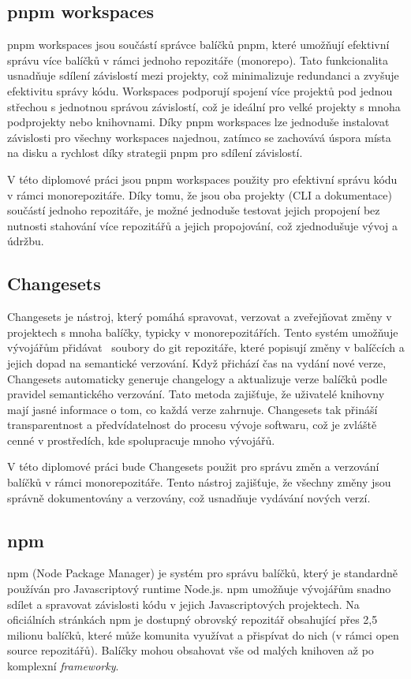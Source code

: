 \subsection{pnpm workspaces}
pnpm workspaces jsou součástí správce balíčků pnpm, které umožňují efektivní správu více balíčků v rámci jednoho repozitáře (monorepo). Tato funkcionalita usnadňuje sdílení závislostí mezi projekty, což minimalizuje redundanci a zvyšuje efektivitu správy kódu. Workspaces podporují spojení více projektů pod jednou střechou s jednotnou správou závislostí, což je ideální pro velké projekty s mnoha podprojekty nebo knihovnami. Díky pnpm workspaces lze jednoduše instalovat závislosti pro všechny workspaces najednou, zatímco se zachovává úspora místa na disku a rychlost díky strategii pnpm pro sdílení závislostí. \cite{PnpmWorkspaces}

V této diplomové práci jsou pnpm workspaces použity pro efektivní správu kódu v rámci monorepozitáře. Díky tomu, že jsou oba projekty (CLI a dokumentace) součástí jednoho repozitáře, je možné jednoduše testovat jejich propojení bez nutnosti stahování více repozitářů a jejich propojování, což zjednodušuje vývoj a údržbu.


\subsection{Changesets}
Changesets je nástroj, který pomáhá spravovat, verzovat a zveřejňovat změny v projektech s mnoha balíčky, typicky v monorepozitářích. Tento systém umožňuje vývojářům přidávat ~soubory do git repozitáře, které popisují změny v balíčcích a jejich dopad na semantické verzování. Když přichází čas na vydání nové verze, Changesets automaticky generuje changelogy a aktualizuje verze balíčků podle pravidel semantického verzování. Tato metoda zajišťuje, že uživatelé knihovny mají jasné informace o tom, co každá verze zahrnuje. Changesets tak přináší transparentnost a předvídatelnost do procesu vývoje softwaru, což je zvláště cenné v prostředích, kde spolupracuje mnoho vývojářů. \cite{Changesets}

V této diplomové práci bude Changesets použit pro správu změn a verzování balíčků v rámci monorepozitáře. Tento nástroj zajišťuje, že všechny změny jsou správně dokumentovány a verzovány, což usnadňuje vydávání nových verzí.

\subsection{npm}
npm (Node Package Manager) je systém pro správu balíčků, který je standardně používán pro Javascriptový runtime Node.js. npm umožňuje vývojářům snadno sdílet a spravovat závislosti kódu v jejich Javascriptových projektech. Na oficiálních stránkách npm je dostupný obrovský repozitář obsahující přes 2,5 milionu balíčků, které může komunita využívat a přispívat do nich (v rámci open source repozitářů). Balíčky mohou obsahovat vše od malých knihoven až po komplexní \emph{frameworky}. \cite{Npm}

